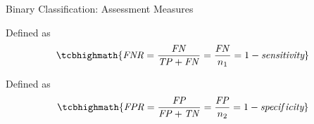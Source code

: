 \begin{frame}{Binary Classif\/{i}cation: Assessment Measures}

 Def\/{i}ned as
\begin{align*}
\tcbhighmath{
  \mathit{FNR} = \frac{\mathit{FN}}{\mathit{TP}+\mathit{FN}} = \frac{\mathit{FN}}{n_1}  = 1 - \textit{sensitivity}
}
\end{align*}

 Def\/{i}ned as
\begin{align*}
\tcbhighmath{
  \mathit{FPR} = \frac{\mathit{FP}}{\mathit{FP}+\mathit{TN}} = \frac{\mathit{FP}}{n_2}= 1 - \specificity
}
\end{align*}
\end{frame}

